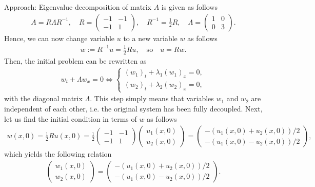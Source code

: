 \documentclass[12pt]{article}
\begin{document}
Approach: Eigenvalue decomposition of matrix $A$ is given as follows
\begin{align*}
	A = R \Lambda R^{-1}, \quad
	R =
	\begin{pmatrix}
		-1 & -1 \\ -1 & 1
	\end{pmatrix}, \quad
	R^{-1} = \frac{1}{2} R, \quad
	\Lambda =
	\begin{pmatrix}
		1 & 0 \\ 0 & 3
	\end{pmatrix}.
\end{align*}
Hence, we can now change variable $u$ to a new variable $w$ as follows
\begin{align*}
	w := R^{-1}u = \frac{1}{2} R u, \quad\text{so}\quad u = Rw.
\end{align*}
Then, the initial problem can be rewritten as
\begin{align*}
	w_t + \Lambda w_x = 0
	\Leftrightarrow
	\begin{cases}
		(w_{1})_{t} +  \lambda_{1}(w_{1})_{x} = 0, \\
		(w_{2})_{t} +  \lambda_{2}(w_{2})_{x} = 0,
	\end{cases}
\end{align*}
with the diagonal matrix $\Lambda$. This step simply means that variables $w_1$ and
$w_2$ are independent of each other, i.e. the original system has been fully decoupled.
Next, let us find the initial condition in terms
of $w$ as follows
\begin{align*}
	w(x, 0)
	= \frac{1}{2} R u(x, 0)
	= \frac{1}{2}
	\begin{pmatrix}
		-1 & -1 \\ -1 & 1
	\end{pmatrix}
	\begin{pmatrix}
		u_{1}(x,0) \\ u_{2}(x,0)
	\end{pmatrix}
	=
	\begin{pmatrix}
		-\left(u_1(x, 0) + u_2(x, 0)\right)/2 \\
		-\left(u_1(x, 0) - u_2(x, 0)\right)/2
	\end{pmatrix},
\end{align*}
which yields the following relation
\begin{align*}
	\begin{pmatrix}
		w_{1}(x,0) \\ w_{2}(x,0)
	\end{pmatrix}
	=
	\begin{pmatrix}
		-\left(u_1(x, 0) + u_2(x, 0)\right)/2 \\
		-\left(u_1(x, 0) - u_2(x, 0)\right)/2
	\end{pmatrix}.
\end{align*}
\end{document}
